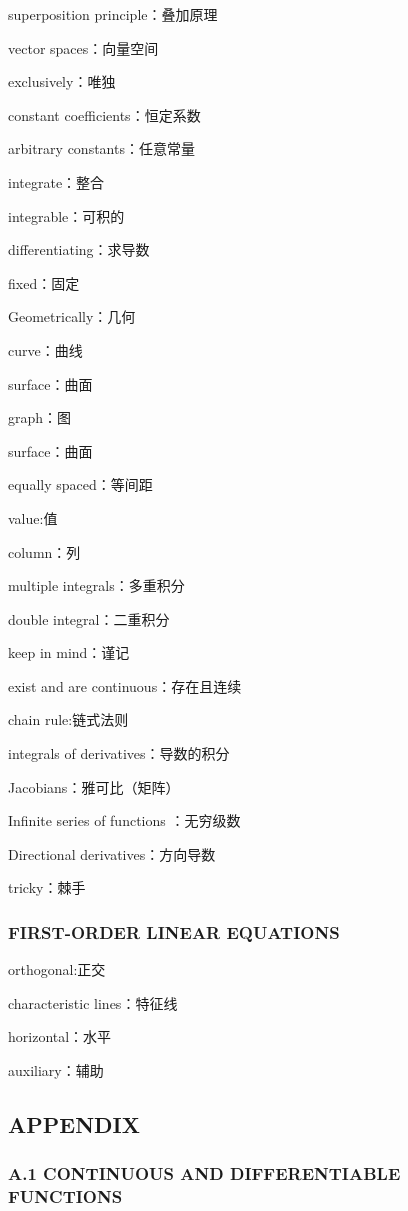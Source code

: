\documentclass[hazy,blue,11pt]{elegantnote}
\begin{document}
    superposition principle：叠加原理

    vector spaces：向量空间

    exclusively：唯独

    constant coefficients：恒定系数

    arbitrary constants：任意常量

    integrate：整合

    integrable：可积的

    differentiating：求导数

    fixed：固定

    Geometrically：几何

    curve：曲线

    surface：曲面

    graph：图

    surface：曲面

    equally spaced：等间距

    value:值

    column：列

    multiple integrals：多重积分

    double integral：二重积分

    keep in mind：谨记

    exist and are continuous：存在且连续

    chain rule:链式法则

    integrals of derivatives：导数的积分

    Jacobians：雅可比（矩阵）

    Infinite series of functions ：无穷级数

    Directional derivatives：方向导数

    tricky：棘手

\subsubsection{FIRST-ORDER LINEAR EQUATIONS}
    orthogonal:正交

    characteristic lines：特征线

    horizontal：水平

    auxiliary：辅助

    


\subsection{APPENDIX}    
\subsubsection{A.1 CONTINUOUS AND DIFFERENTIABLE FUNCTIONS}
\end{document}
